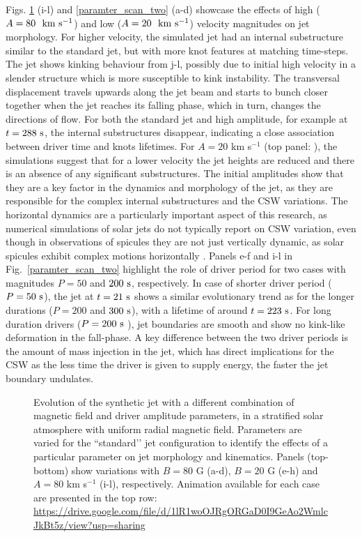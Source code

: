 %
Figs. \ref{paramter_scan_one} (i-l) and \ref{paramter_scan_two} (a-d) showcase the effects of high ($A = 80 ~~\rm{km ~s^{-1}}$) and low ($A = 20 ~~\rm{km ~s^{-1}}$) velocity magnitudes on jet morphology. For higher velocity, the simulated jet had an internal substructure similar to the standard jet, but with more knot features at matching time-steps. The jet shows kinking behaviour from j-l, possibly due to initial high velocity in a slender structure which is more susceptible to kink instability. The transversal displacement travels upwards along the jet beam and starts to bunch closer together when the jet reaches its falling phase, which in turn, changes the directions of flow. For both the standard jet and high amplitude, for example at $t = 288 ~\rm{s}$, the internal substructures disappear, indicating a close association between driver time and knots lifetimes. For $A = 20$ km s$^{-1}$ (top panel: ), the simulations suggest that for a lower velocity the jet heights are reduced and there is an absence of any significant substructures. The initial amplitudes show that they are a key factor in the dynamics and morphology of the jet, as they are responsible for the complex internal substructures and the CSW variations. The horizontal dynamics are a particularly important aspect of this research, as numerical simulations of solar jets do not typically report on CSW variation, even though in observations of spicules they are not just vertically dynamic, as solar spicules exhibit complex motions horizontally \citep{Sharma2018ApJ85361S,Antolin2018ApJ85644A}. \np
%
Panels e-f and i-l in Fig.~\ref{paramter_scan_two} highlight the role of driver period for two cases with magnitudes $P = 50$ and $200~\rm{s}$, respectively. In case of shorter driver period ($P = 50 ~\rm{s}$), the jet at $t = 21~\rm{s}$ shows a similar evolutionary trend as for the longer durations ($P = 200$ and $300~\rm{s}$), with a lifetime of around $t = 223~\rm{s}$. For long duration drivers ($P = 200~\rm{s}$ ), jet boundaries are smooth and show no kink-like deformation in the fall-phase. A key difference between the two driver periods is the amount of mass injection in the jet, which has direct implications for the CSW as the less time the driver is given to supply energy, the faster the jet boundary undulates. \np
\begin{figure}
\captionsetup[subfigure]{labelformat=empty}
\centering
{}
\caption{Evolution of the synthetic jet with a different combination of magnetic field and driver amplitude parameters, in a stratified solar atmosphere with uniform radial magnetic field. Parameters are varied for the ``standard’’ jet configuration to identify the effects of a particular parameter on jet morphology and kinematics. Panels (top-bottom) show variations with $B = 80$ G (a-d), $B = 20$ G  (e-h) and $A = 80$ km s$^{-1}$ (i-l), respectively. Animation available for each case are presented in the top row: \url{https://drive.google.com/file/d/1lR1woOJRgORGaD0I9GeAo2WmlcJkBt5z/view?usp=sharing} }
\label{paramter_scan_one}
\end{figure}
